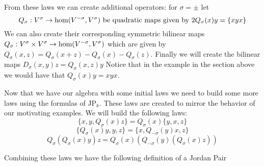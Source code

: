 From these laws we can create additional operators: for $\sigma=\pm$ let
\[Q_\sigma:V^\sigma\rightarrow \hom(V^{-\sigma},V^{\sigma})\text{ be quadratic maps given by }2Q_\sigma(x)y = \{xyx\}\]
We can also create their corresponding symmetric bilinear maps 
$Q_\sigma:V^\sigma\times V^\sigma\rightarrow \hom(V^{-\sigma},V^{\sigma})$ which are given by 
$Q_\sigma(x,z)=Q_\sigma(x+z)-Q_\sigma(x)-Q_\sigma(z)$. %
Finally we will create the bilinear maps $D_\sigma(x,y)z=Q_\sigma(x,z)y$
Notice that in the example in the section above we would have that $Q_\sigma(x)y=xyx$.

Now that we have our algebra with some initial laws we need to build some more laws using the formulas of $\text{JP}_k$.
These laws are created to mirror the behavior of our motivating examples.
We will build the following laws:
\begin{equation}
    \tag{JP1}
    \{x,y,Q_\sigma(x)z\}=Q_\sigma(x)\{y,x,z\}
\end{equation}
\begin{equation}
    \tag{JP2}
    \{Q_\sigma(x)y,y,z\}=\{x,Q_{-\sigma}(y)x,z\}
\end{equation}
\begin{equation}
    \tag{JP3}
    Q_{\sigma}(Q_{\sigma}(x)y)z=Q_{\sigma}(x)(Q_{-\sigma}(y)(Q_{\sigma}(x)z))
\end{equation}


Combining these laws we have the following definition of a Jordan Pair

